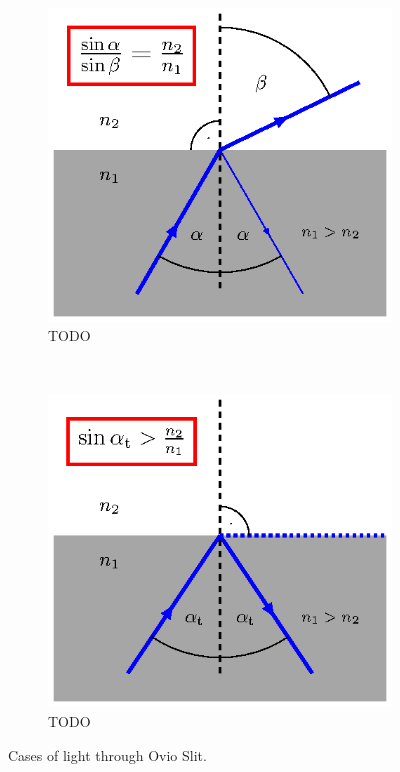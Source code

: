 \documentclass[crop,border=5,tikz,convert={outext=.svg,command=\unexpanded{pdf2svg
    \infile\space\outfile}},multi=false]{standalone}
\begin{document}
\begin{figure}[!h]
\begin{subfigure}[b]{0.45\textwidth}
\includegraphics[scale=1]{rlaw3.ps}
\caption{TODO}
\end{subfigure}
~
\begin{subfigure}[b]{0.45\textwidth}
\includegraphics[scale=1]{rlaw4.ps}
\caption{TODO}
\end{subfigure}

\caption{Cases of light through Ovio Slit.}
\end{figure}
\end{document}
